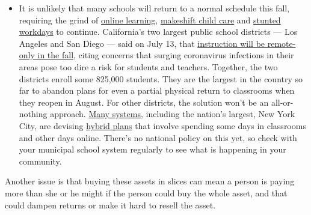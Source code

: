 \begin{itemize}
  \begin{itemize}
  \tightlist
  \item
    It is unlikely that many schools will return to a normal schedule
    this fall, requiring the grind of
    \href{https://www.nytimes3xbfgragh.onion/2020/06/05/us/coronavirus-education-lost-learning.html?action=click\&pgtype=Article\&state=default\&region=MAIN_CONTENT_3\&context=storylines_faq}{online
    learning},
    \href{https://www.nytimes3xbfgragh.onion/2020/05/29/us/coronavirus-child-care-centers.html?action=click\&pgtype=Article\&state=default\&region=MAIN_CONTENT_3\&context=storylines_faq}{makeshift
    child care} and
    \href{https://www.nytimes3xbfgragh.onion/2020/06/03/business/economy/coronavirus-working-women.html?action=click\&pgtype=Article\&state=default\&region=MAIN_CONTENT_3\&context=storylines_faq}{stunted
    workdays} to continue. California's two largest public school
    districts --- Los Angeles and San Diego --- said on July 13, that
    \href{https://www.nytimes3xbfgragh.onion/2020/07/13/us/lausd-san-diego-school-reopening.html?action=click\&pgtype=Article\&state=default\&region=MAIN_CONTENT_3\&context=storylines_faq}{instruction
    will be remote-only in the fall}, citing concerns that surging
    coronavirus infections in their areas pose too dire a risk for
    students and teachers. Together, the two districts enroll some
    825,000 students. They are the largest in the country so far to
    abandon plans for even a partial physical return to classrooms when
    they reopen in August. For other districts, the solution won't be an
    all-or-nothing approach.
    \href{https://bioethics.jhu.edu/research-and-outreach/projects/eschool-initiative/school-policy-tracker/}{Many
    systems}, including the nation's largest, New York City, are
    devising
    \href{https://www.nytimes3xbfgragh.onion/2020/06/26/us/coronavirus-schools-reopen-fall.html?action=click\&pgtype=Article\&state=default\&region=MAIN_CONTENT_3\&context=storylines_faq}{hybrid
    plans} that involve spending some days in classrooms and other days
    online. There's no national policy on this yet, so check with your
    municipal school system regularly to see what is happening in your
    community.
  \end{itemize}
\end{itemize}

Another issue is that buying these assets in slices can mean a person is
paying more than she or he might if the person could buy the whole
asset, and that could dampen returns or make it hard to resell the
asset.

